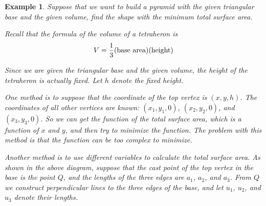 \documentclass{article}
\newtheorem{example}{Example}
\begin{document}
\begin{example}
  Suppose that we want to build a pyramid with the given triangular base and the 
  given volume, find the shape with the minimum total surface area.

  Recall that the formula of the volume of a tetraheron is
  \[ V = \frac{1}{3}(\textnormal{base area})(\textnormal{height}) \]

  Since we are given the triangular base and the given volume, the height of the 
  tetraheron is actually fixed. Let $h$ denote the fixed height.

  One method is to suppose that the coordinate of the top vertex is $(x, y, h)$. 
  The coordinates of all other vertices are known: $(x_1, y_1, 0)$, 
  $(x_2, y_2, 0)$, and $(x_3, y_3, 0)$. So we can get the function of the total 
  surface area, which is a function of $x$ and $y$, and then try to minimize the 
  function. The problem with this method is that the function can be too 
  complex to minimize.


  Another method is to use different variables to calculate the total surface 
  area. As shown in the above diagram, suppose that the cast point of the top 
  vertex in the base is the point $Q$, and the lengths of the three edges are 
  $a_1$, $a_2$, and $a_3$. From $Q$ we construct perpendicular lines to the 
  three edges of the base, and let $u_1$, $u_2$, and $u_3$ denote their lengths.


\end{example}
\end{document}
